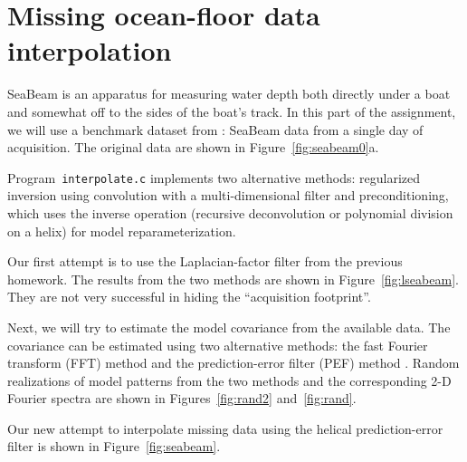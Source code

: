 \section{Missing ocean-floor data interpolation}

SeaBeam is an apparatus for measuring water depth both directly under
a boat and somewhat off to the sides of the boat's track. In this part
of the assignment, we will use a benchmark dataset from \cite{gee}:
SeaBeam data from a single day of acquisition. The original data are
shown in Figure~\ref{fig:seabeam0}a.


Program~\texttt{interpolate.c} implements two alternative methods:
regularized inversion using convolution with a multi-dimensional
filter and preconditioning, which uses the inverse operation
(recursive deconvolution or polynomial division on a helix) for model
reparameterization.

Our first attempt is to use the Laplacian-factor filter from the
previous homework. The results from the two methods are shown in
Figure~\ref{fig:lseabeam}. They are not very successful in hiding
the ``acquisition footprint''.


Next, we will try to estimate the model covariance from the available
data. The covariance can be estimated using two alternative methods:
the fast Fourier transform (FFT) method \cite[]{jim} and the
prediction-error filter (PEF) method \cite[]{textures}. Random
realizations of model patterns from the two methods and the
corresponding 2-D Fourier spectra are shown in Figures~\ref{fig:rand2}
and~\ref{fig:rand}.




Our new attempt to interpolate missing data using the helical
prediction-error filter is shown in Figure~\ref{fig:seabeam}.

